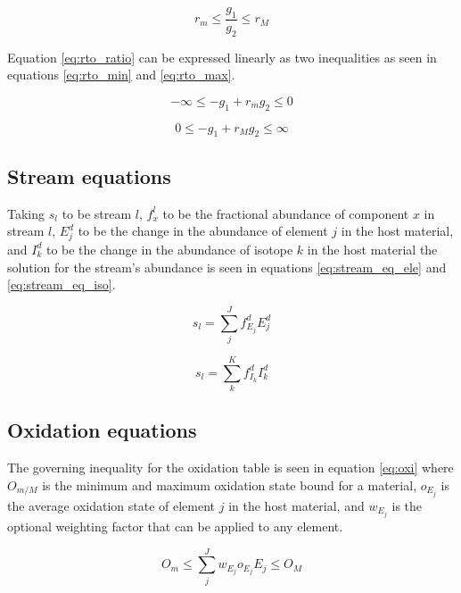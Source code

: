 \documentclass[]{elsarticle}
\begin{document}
\begin{equation}
\label{eq:rto_ratio}
r_{m} \leq \frac{g_{1}}{g_{2}} \leq r_{M} 
\end{equation}

Equation \ref{eq:rto_ratio} can be expressed linearly as two inequalities as
seen in equations \ref{eq:rto_min} and \ref{eq:rto_max}.

\begin{equation}
\label{eq:rto_min}
-\infty \leq -g_{1} + r_{m}g_{2} \leq 0
\end{equation}

\begin{equation}
\label{eq:rto_max}
0 \leq -g_{1} + r_{M}g_{2} \leq \infty
\end{equation}

\subsection{Stream equations} \label{ssec:stream_eq}
Taking $s_{l}$ to be stream $l$, $f_{x}^{l}$ to be the fractional abundance
of component $x$ in stream $l$, $E_{j}^{d}$ to be the change in the 
abundance of element $j$ in the host material, and $I_{k}^{d}$ to be 
the change in the abundance of isotope $k$ in the host
material the solution for the stream's abundance is seen in equations
\ref{eq:stream_eq_ele} and \ref{eq:stream_eq_iso}.

\begin{equation}
\label{eq:stream_eq_ele}
s_{l} = \sum \limits_{j}^{J} f_{E_{j}}^{d} E_{j}^{d}
\end{equation}

\begin{equation}
\label{eq:stream_eq_iso}
s_{l} = \sum \limits_{k}^{K} f_{I_{k}}^{d} I_{k}^{d}
\end{equation}

\subsection{Oxidation equations} \label{ssec:oxid_eq}
The governing inequality for the oxidation table is seen in equation
\ref{eq:oxi} where $O_{m/M}$ is the minimum and maximum oxidation
state bound for a material, $o_{E_{j}}$ is the average oxidation state of
element $j$ in the host material, and $w_{E_{j}}$ is the optional weighting
factor that can be applied to any element. 

\begin{equation}
\label{eq:oxi}
O_{m} \leq \sum \limits_{j}^{J} w_{E_{j}} o_{E_{j}} E_{j} \leq O_{M}
\end{equation}
\end{document}
